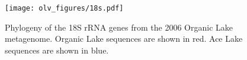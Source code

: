 \begin{landscape}
\begin{centering}
\begin{figure}
\texttt{[image: olv\_figures/18s.pdf]}
\caption[Phylogeny of the 18S rRNA genes from Organic Lake]{Phylogeny of the 18S rRNA genes from the 2006 Organic Lake metagenome. 
Organic Lake sequences are shown in red.
Ace Lake sequences are shown in blue.
}
\label{fig:18s}

\end{figure}
\end{centering}
\end{landscape}

